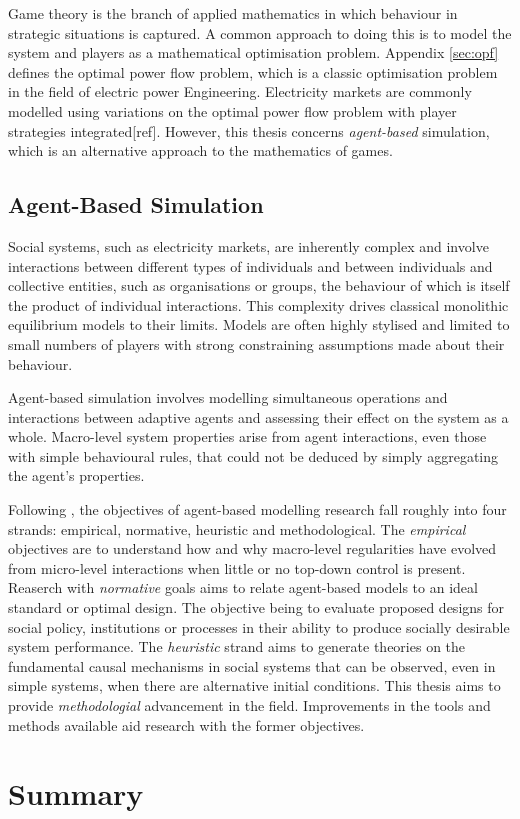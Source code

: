 Game theory is the branch of applied mathematics in which behaviour in
strategic situations is captured.  A common approach to doing this is to
model the system and players as a mathematical optimisation problem.  Appendix
\ref{sec:opf} defines the optimal power flow problem, which is a classic
optimisation problem in the field of electric power Engineering.  Electricity
markets are commonly modelled using variations on the optimal power flow problem with
player strategies integrated[ref].  However, this thesis concerns
\textit{agent-based} simulation, which is an alternative approach to the mathematics of games.

\subsection{Agent-Based Simulation}
Social systems, such as electricity markets, are inherently complex and involve
interactions between different types of individuals and between individuals
and collective entities, such as organisations or groups, the behaviour of which
is itself the product of individual interactions.  This complexity
drives classical monolithic equilibrium models to their limits.  Models are
often highly stylised and limited to small numbers of players with strong
constraining assumptions made about their behaviour.

Agent-based simulation involves modelling simultaneous operations and
interactions between adaptive agents and assessing their effect on the system
as a whole.  Macro-level system properties arise from agent interactions, even
those with simple behavioural rules, that could not be deduced by simply
aggregating the agent's properties. %

Following \cite{tesfatsi:handbook}, the objectives of agent-based modelling
research fall roughly into four strands: empirical, normative, heuristic and
methodological. The \textit{empirical} objectives are to understand how and why macro-level
regularities have evolved from micro-level interactions when little or no
top-down control is present.  Reaserch with \textit{normative} goals aims to
relate agent-based models to an ideal standard or optimal design.  The objective being
to evaluate proposed designs for social policy, institutions or processes in
their ability to produce socially desirable system performance.  The
\textit{heuristic} strand aims to generate theories on the fundamental causal
mechanisms in social systems that can be observed, even in simple systems, when there are
alternative initial conditions.  This thesis aims to provide
\textit{methodologial} advancement in the field.  Improvements in the tools
and methods available aid research with the former objectives.

\section{Summary}
